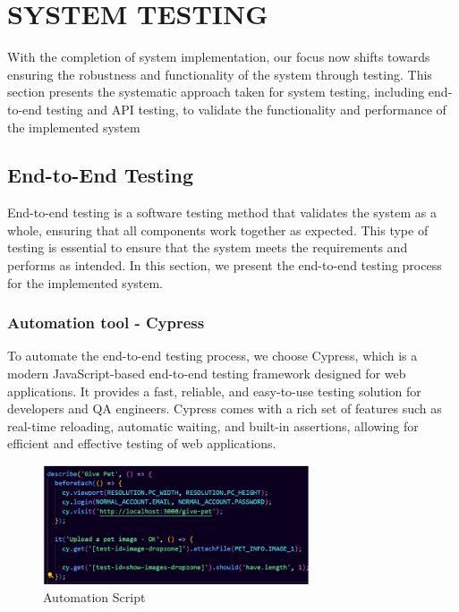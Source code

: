 \chapter{SYSTEM TESTING}

With the completion of system implementation, our focus now shifts towards ensuring the robustness and functionality of the system through testing. This section presents the systematic approach taken for system testing, including end-to-end testing and API testing, to validate the functionality and performance of the implemented system

\section{End-to-End Testing}

End-to-end testing is a software testing method that validates the system as a whole, ensuring that all components work together as expected. This type of testing is essential to ensure that the system meets the requirements and performs as intended. In this section, we present the end-to-end testing process for the implemented system.

\subsection{Automation tool - Cypress}

To automate the end-to-end testing process, we choose Cypress, which is a modern JavaScript-based end-to-end testing framework designed for web applications. It provides a fast, reliable, and easy-to-use testing solution for developers and QA engineers. Cypress comes with a rich set of features such as real-time reloading, automatic waiting, and built-in assertions,  allowing for efficient and effective testing of web applications.

\begin{figure}[H]
    \centering
    \includegraphics[width=0.7\textwidth]{Figures/cypress_script.png}
    \caption{Automation Script}
    \label{fig:cypress-script}
\end{figure}


